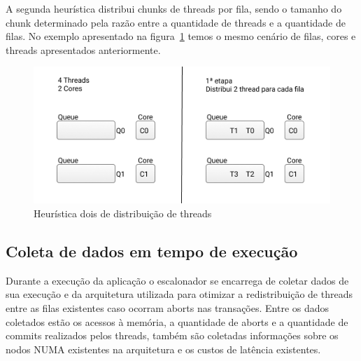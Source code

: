 \documentclass[diss,capa]{texufpel}
\begin{document}
A segunda heurística distribui chunks de threads por fila, sendo o tamanho do chunk determinado pela razão entre a quantidade de threads e a quantidade de filas. No exemplo apresentado na figura~\ref{queue_two} temos o mesmo cenário de filas, cores e threads apresentados anteriormente.



\begin{figure}[htbp]
 \centering
 \includegraphics[scale=.8]{images/Queue_two.png}
\caption{Heurística dois de distribuição de threads}
\label{queue_two}
\end{figure}


\subsection{Coleta de dados em tempo de execução}
\label{coleta}

Durante a execução da aplicação o escalonador se encarrega de coletar dados de sua execução e da arquitetura utilizada para otimizar a redistribuição de threads entre as filas existentes caso ocorram aborts nas transações. Entre os dados coletados estão os acessos à memória, a quantidade de aborts e a quantidade de commits realizados pelos threads, também são coletadas informações sobre os nodos NUMA existentes na arquitetura e os custos de latência existentes.
\end{document}
